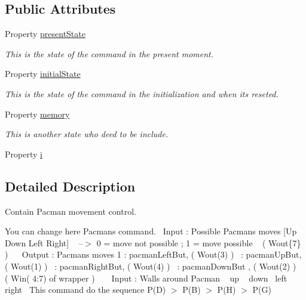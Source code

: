 \subsection*{Public Attributes}
\begin{DoxyCompactItemize}
\item 
Property \hyperlink{class_model_pacman_a9624cc7c421a50fa5086b0ebd0cd5fe3}{present\+State}
\begin{DoxyCompactList}\small\item\em This is the state of the command in the present moment. \end{DoxyCompactList}\item 
Property \hyperlink{class_model_pacman_acd9263acfa96c9138afdf497e55acc24}{initial\+State}
\begin{DoxyCompactList}\small\item\em This is the state of the command in the initialization and when it\textquotesingle{}s reseted. \end{DoxyCompactList}\item 
Property \hyperlink{class_model_pacman_a9a61c54203464d470acd8580a6464f8e}{memory}
\begin{DoxyCompactList}\small\item\em This is another state who deed to be include. \end{DoxyCompactList}\item 
Property \hyperlink{class_model_pacman_a103c618d75e54c3a72fac6bcaa59f61f}{i}
\end{DoxyCompactItemize}


\subsection{Detailed Description}
Contain Pacman movement control. 

You can change here Pacman\textquotesingle{}s command.~\newline
 Input \+: Possible Pacman\textquotesingle{}s moves \mbox{[}Up Down Left Right\mbox{]} ~\newline
 --$>$ 0 = move not possible ; 1 = move possible ~\newline
 ( Wout\{7\} )~\newline
~\newline
 Output \+: Pacman\textquotesingle{}s moves 1 \+: pacman\+Left\+But, ( Wout(3) )~ \+: pacman\+Up\+But, ( Wout(1) )~ \+: pacman\+Right\+But, ( Wout(4) )~ \+: pacman\+Down\+But , ( Wout(2) )~\newline
 ( Win( 4\+:7) of wrapper ) ~\newline
 ~\newline
 Input \+: Walls around Pacman ~ up ~ down~ left~ right~\newline
 This command do the sequence P(\+D) $>$ P(\+B) $>$ P(\+H) $>$ P(\+G) ~\newline
 

